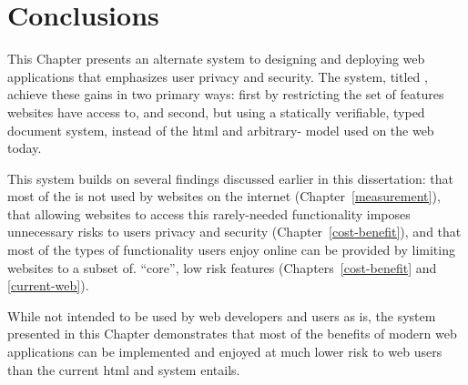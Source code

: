 \section{Conclusions}
\label{future-web:conclusions}
This Chapter presents an alternate system to designing and deploying web
applications that emphasizes user privacy and security.  The system, titled
\CDF, achieve these gains in two primary ways: first by restricting the set of
\WAPI features websites have access to, and second, but using a statically
verifiable, typed document system, instead of the \gls{html} and arbitrary-\JS
model used on the web today.

This system builds on several findings discussed earlier in this dissertation:
that most of the \WAPI is not used by websites on the internet
(Chapter~\ref{measurement}), that allowing websites to access this
rarely-needed functionality imposes unnecessary risks to users privacy and
security  (Chapter~\ref{cost-benefit}), and that most of the types of
functionality users enjoy online can be provided by limiting websites to a
subset of.  ``core'', low risk \WAPI features (Chapters~\ref{cost-benefit} and
\ref{current-web}).

While not intended to be used by web developers and users as is, the \CDF
system presented in this Chapter demonstrates that most of the benefits of
modern web applications can be implemented and enjoyed at much lower risk to
web users than the current \gls{html} and \JS system entails.
